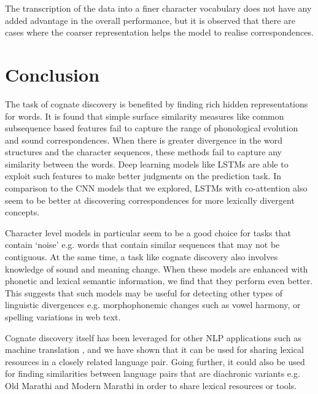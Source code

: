 \documentclass[11pt,letterpaper]{article}
\begin{document}
The transcription of the data into a finer character vocabulary does not have any added advantage in the overall performance, but it is observed that there are cases where the coarser representation helps the model to realise correspondences.

\section{Conclusion}

The task of cognate discovery is benefited by finding rich hidden representations for words. It is found that simple surface similarity measures like common subsequence based features fail to capture the range of phonological evolution and sound correspondences. When there is greater divergence in the word structures and the character sequences, these methods fail to capture any similarity between the words. Deep learning models like LSTMs are able to exploit such features to make better judgments on the prediction task. In comparison to the CNN models that we explored, LSTMs with co-attention also seem to be better at discovering correspondences for more lexically divergent concepts.

Character level models in particular seem to be a good choice for tasks that contain `noise' e.g. words that contain similar sequences that may not be contiguous. At the same time, a task like cognate discovery also involves knowledge of sound and meaning change. When these models are enhanced with phonetic and lexical semantic information, we find that they perform even better. This suggests that such models may be useful for detecting other types of linguistic divergences e.g. morphophonemic changes such as vowel harmony, or spelling variations in web text.

Cognate discovery itself has been leveraged for other NLP applications such as machine translation \cite{kondrak2003cognates}, and we have shown that it can be used for sharing lexical resources in a closely related language pair. Going further, it could also be used for finding similarities between language pairs that are diachronic variants e.g. Old Marathi and Modern Marathi in order to share lexical resources or tools.





\end{document}
